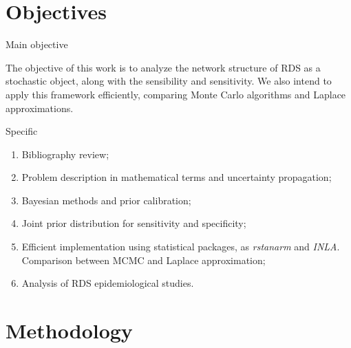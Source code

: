 \documentclass{beamer}
\begin{document}


\section{Objectives}

\begin{frame}{Main objective}

  The objective of this work is to analyze the network structure of RDS as a
stochastic object, along with the sensibility and sensitivity. We also intend
to apply this framework efficiently, comparing Monte Carlo algorithms and
Laplace approximations.
  
\end{frame}

\begin{frame}{Specific}

  \begin{enumerate}
    \item Bibliography review; 

    \item Problem description in mathematical terms and uncertainty propagation; 

    \item Bayesian methods and prior calibration; 

    \item Joint prior distribution for sensitivity and specificity;

    \item Efficient implementation using statistical packages, as {\em
    rstanarm} and {\em INLA}. Comparison between MCMC and Laplace
    approximation; 

    \item Analysis of RDS epidemiological studies.
  \end{enumerate}
  
\end{frame}



\section{Methodology}

\end{document}
